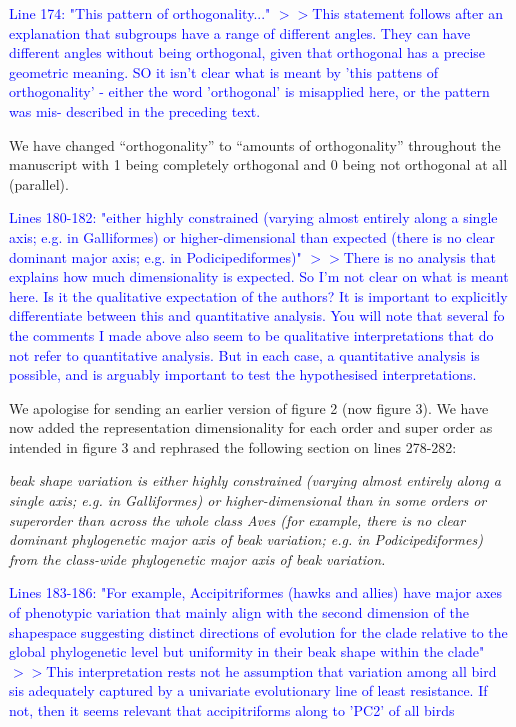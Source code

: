 \documentclass[12pt,letterpaper]{article}
\begin{document}
{\textcolor{blue}{Line 174: "This pattern of orthogonality..."
$>>$This statement follows after an explanation that subgroups have a range of different angles. They can have different angles without being orthogonal, given that orthogonal has a precise geometric meaning. SO it isn't clear what is meant by 'this pattens of orthogonality' - either the word 'orthogonal' is misapplied here, or the pattern was mis- described in the preceding text.}

We have changed “orthogonality” to “amounts of orthogonality” throughout the manuscript with 1 being completely orthogonal and 0 being not orthogonal at all (parallel).

\textcolor{blue}{Lines 180-182: "either highly constrained (varying almost entirely along a single axis; e.g. in Galliformes) or higher-dimensional than expected (there is no clear dominant major axis; e.g. in Podicipediformes)" 
$>>$There is no analysis that explains how much dimensionality is expected. So I'm not clear on what is meant here. Is it the qualitative expectation of the authors? It is important to explicitly differentiate between this and quantitative analysis. You will note that several fo the comments I made above also seem to be qualitative interpretations that do not refer to quantitative analysis. But in each case, a quantitative analysis is possible, and is arguably important to test the hypothesised interpretations.}

We apologise for sending an earlier version of figure 2 (now figure 3). We have now added the representation dimensionality for each order and super order as intended in figure 3 and rephrased the following section on lines 278-282:

\noindent\textit{beak shape variation is either highly constrained (varying almost entirely along a single axis; e.g. in Galliformes) or higher-dimensional than in some orders or superorder than across the whole class Aves (for example, there is no clear dominant phylogenetic major axis of beak variation; e.g. in Podicipediformes) from the class-wide phylogenetic major axis of beak variation.} %

\textcolor{blue}{Lines 183-186: "For example, Accipitriformes (hawks and allies) have major axes of phenotypic variation that mainly align with the second dimension of the shapespace suggesting distinct directions of evolution for the clade relative to the global phylogenetic level but uniformity in their beak shape within the clade"
$>>$This interpretation rests not he assumption that variation among all bird sis adequately captured by a univariate evolutionary line of least resistance. If not, then it seems relevant that accipitriforms along to 'PC2' of all birds}

}
\end{document}
